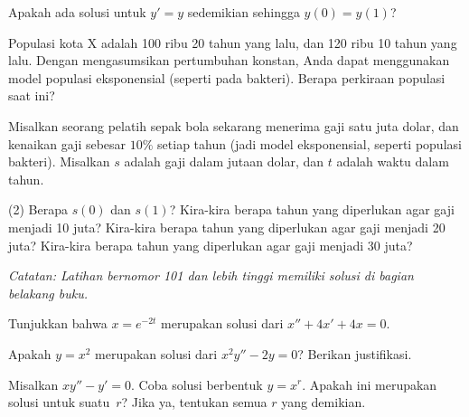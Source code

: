 \begin{exercise}
Apakah ada solusi untuk $y' = y$ sedemikian sehingga $y(0) = y(1)$?
\end{exercise}

\begin{exercise}
Populasi kota X adalah 100 ribu 20 tahun yang lalu,
dan 120 ribu 10 tahun yang lalu. Dengan mengasumsikan
pertumbuhan konstan, Anda dapat menggunakan model populasi eksponensial
(seperti pada bakteri). Berapa perkiraan populasi saat ini?
\end{exercise}

\begin{exercise}
Misalkan seorang pelatih sepak bola sekarang menerima gaji
satu juta dolar, dan kenaikan gaji sebesar $10\%$ setiap tahun
(jadi model eksponensial, seperti populasi bakteri).
Misalkan $s$ adalah gaji dalam jutaan dolar, dan $t$ adalah waktu dalam tahun.
\begin{tasks}(2)
\task
Berapa $s(0)$ dan $s(1)$?
\task
Kira-kira berapa tahun yang diperlukan agar gaji menjadi 10 juta?
\task
Kira-kira berapa tahun yang diperlukan agar gaji menjadi 20 juta?
\task
Kira-kira berapa tahun yang diperlukan agar gaji menjadi 30 juta?
\end{tasks}
\end{exercise}


\noindent
\emph{Catatan: Latihan bernomor 101 dan lebih tinggi memiliki solusi di
bagian belakang buku.}


\setcounter{exercise}{100}

\begin{exercise}
Tunjukkan bahwa $x = e^{-2t}$ merupakan solusi dari $x'' + 4x' + 4x = 0$.
\end{exercise}

\begin{exercise}
Apakah $y = x^2$ merupakan solusi dari $x^2y'' - 2y = 0$? Berikan justifikasi.
\end{exercise}

\begin{exercise}
Misalkan $xy'' - y' = 0$. Coba solusi berbentuk $y = x^r$. Apakah ini
merupakan solusi untuk suatu~$r$? Jika ya, tentukan semua $r$ yang demikian.
\end{exercise}


